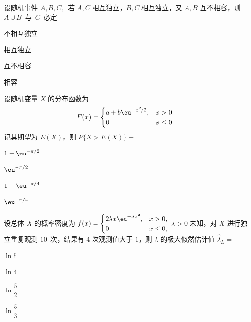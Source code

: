 \begin{question}[index=8]
设随机事件 $A,B,C$，若 $A,C$ 相互独立，$B,C$ 相互独立，又 $A,B$ 互不相容，则 \allowbreak\mbox{$A\cup B$ 与 $C$ 必定}
\begin{choices}[columns=4]
\item 不相互独立
\item 相互独立
\item 互不相容
\item 相容
\end{choices}
\end{question}
\QuestionBreak

\begin{question}[index=9]
设随机变量 $X$ 的分布函数为
\[
F(x)=\begin{cases}a+b\eu^{-x^2/2},&x>0,\\0,&x\le0.\end{cases}
\]
记其期望为 $E(X)$，则 $P\{X>E(X)\}=$
\begin{choices}[columns=4]
\item $1-\eu^{-\pi/2}$
\item $\eu^{-\pi/2}$
\item $1-\eu^{-\pi/4}$
\item $\eu^{-\pi/4}$
\end{choices}
\end{question}
\QuestionBreak

\begin{question}[index=10]
设总体 $X$ 的概率密度为 $f(x)=\begin{cases}2\lambda x\eu^{-\lambda x^2},&x>0,\\0,&x\le0,\end{cases}$
$\lambda>0$ 未知。对 $X$ 进行独立重复观测 \allowbreak\mbox{$10$ 次}，结果有 $4$ 次观测值大于 $1$，则 $\lambda$ 的极大似然估计值 $\widehat\lambda_L=$
\begin{choices}[columns=4]
\item $\ln 5$
\item $\ln 4$
\item $\ln\dfrac52$
\item $\ln\dfrac53$
\end{choices}
\end{question}
